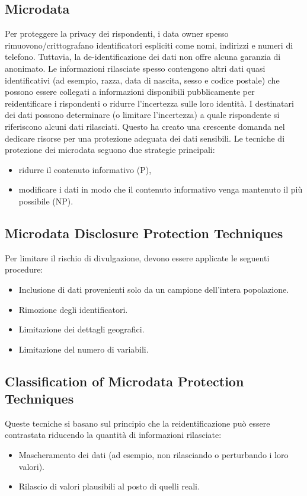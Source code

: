\documentclass{report}
\begin{document}
\subsection{Microdata}
Per proteggere la privacy dei rispondenti, i data owner spesso rimuovono/crittografano identificatori espliciti come nomi, indirizzi e numeri di telefono. Tuttavia, la de-identificazione dei dati non offre alcuna garanzia di anonimato.
Le informazioni rilasciate spesso contengono altri dati quasi identificativi (ad esempio, razza, data di nascita, sesso e codice postale) che possono essere collegati a informazioni disponibili pubblicamente per reidentificare i rispondenti o ridurre l'incertezza sulle loro identità. 
I destinatari dei dati possono determinare (o limitare l'incertezza) a quale rispondente si riferiscono alcuni dati rilasciati. Questo ha creato una crescente domanda nel dedicare risorse per una protezione adeguata dei dati sensibili.
Le tecniche di protezione dei microdata seguono due strategie principali:
\begin{itemize}
    \item ridurre il contenuto informativo (P),
    \item modificare i dati in modo che il contenuto informativo venga mantenuto il più possibile (NP).
\end{itemize}


\subsection{Microdata Disclosure Protection Techniques}
Per limitare il rischio di divulgazione, devono essere applicate le seguenti procedure:
\begin{itemize}
    \item Inclusione di dati provenienti solo da un campione dell'intera popolazione.
    \item Rimozione degli identificatori.
    \item Limitazione dei dettagli geografici.
    \item Limitazione del numero di variabili.
\end{itemize}

\subsection{Classification of Microdata Protection Techniques}
Queste tecniche si basano sul principio che la reidentificazione può essere contrastata riducendo la quantità di informazioni rilasciate:
\begin{itemize}
    \item Mascheramento dei dati (ad esempio, non rilasciando o perturbando i loro valori).
    \item Rilascio di valori plausibili al posto di quelli reali.
\end{itemize}
\end{document}

